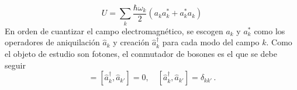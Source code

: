 \begin{equation}
  \label{EM.22}
  U = \sum_{k} \frac{\hbar\omega_{k}}{2}\left(a_{k}a^{*}_{k} + a_{k}^{*} a_{k} \right)
\end{equation}
En orden de cuantizar el campo electromagnético, se escogen $a_{k}$ y $a^{*}_{k}$ como los operadores de aniquilaci\'on $\hat{a}_{k}$ y creaci\'on $\hat{a}^{\dagger}_{k}$ para cada modo del campo $k$. Como el objeto de estudio son fotones, el conmutador de bosones es el que se debe seguir
\begin{equation*}
  [\hat{a}_k, \hat{a}^{\dagger}_{k'}] = [\hat{a}^{\dagger}_k, \hat{a}_{k'}] = 0, \quad [\hat{a}^{\dagger}_k, \hat{a}_{k'}] = \delta_{kk'} \,.
\end{equation*}

\begin{comment}

Los operadores de campo electromagnético $\mathbf{E}$, $\mathbf{B}$ y $\vec{A}$ son Hermitianos (demostrar, Agarwal), por lo que se pueden descomponer al campo $\mathbf{A}$ en la suma del campo $\mathbf{A}^{(+)}$ que contiene todas las frecuencias positivas  y su complejo conjugado $\mathbf{A}^{(-)}$. (Walls)

Considere primero una onda electromagnética, descompuesta en dos términos de esta forma
\begin{equation*}
  \mathbf{E}^{(+)} = \hat{\varepsilon} E_0 \exp{\left(i\vec{k}\cdot \vec{r} - i\omega_k t\right)}, \omega > 0
\end{equation*}
Donde $k = |\vec{k}| = \omega_k/c$y $\hat{\varepsilon}$ es el vector de polarización del campo electromagnético, el cual es ortogonal a la dirección de propagación y es perpendicular a la dirección de propagación $\vec{k}$. Hay dos direcciones de polarización, y se denota por el índice $s$ con valores $1$, $2$. De esta forma se tiene que el vector de polarización depende de dos índices y $\vec{\varepsilon} = \vec{\varepsilon}_{\vec{k},s}$ En términos del operador campo vectorial $\mathbf{A}$ del gauge de Coulomb
\begin{align*}
  \mathbf{A}^{(+)} & = -\frac{1}{c}\frac{\partial \mathbf{A}}{dt} \mathbf{E}^{(+)}                                                           \\
                   & = -\frac{(-i\omega_k)}{c}\hat{\varepsilon} E_0 \exp{\left(i\vec{k}\cdot \vec{r} - i\omega_k t\right)}, \quad \omega > 0 \\
                   & = \hat{\varepsilon} A_0 \exp{\left(i\vec{k}\cdot \vec{r} - i\omega_k t\right)}, \quad \omega > 0
\end{align*}
Donde $A_0=\frac{(i\omega_k)}{c}E_0$. Esto nos permite construir la solución de onda plana de la ecuación de onda del campo vectorial $\mathbf{A}$. (Agarwal) Al término $\hat{\varepsilon} \exp{\left(i\vec{k}\cdot \vec{r}\right)}$ se le denomina función de modo y se le denotará por $\hat{u} = \hat{u}(\vec{r})$, satisfacen la ecuación de onda y de transversalidad al igual que $\mathbf{A}$. (Walls).


\end{comment}
